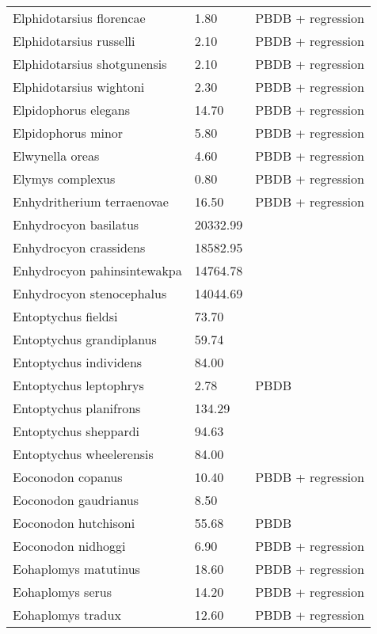 \begin{longtable}{p{} p{} p{}}
    Elphidotarsius florencae & 1.80 & PBDB + regression \\ 
    Elphidotarsius russelli & 2.10 & PBDB + regression \\ 
    Elphidotarsius shotgunensis & 2.10 & PBDB + regression \\ 
    Elphidotarsius wightoni & 2.30 & PBDB + regression \\ 
    Elpidophorus elegans & 14.70 & PBDB + regression \\ 
    Elpidophorus minor & 5.80 & PBDB + regression \\ 
    Elwynella oreas & 4.60 & PBDB + regression \\ 
    Elymys complexus & 0.80 & PBDB + regression \\ 
    Enhydritherium terraenovae & 16.50 & PBDB + regression \\ 
    Enhydrocyon basilatus & 20332.99 & \cite{Tomiya2013} \\ 
    Enhydrocyon crassidens & 18582.95 & \cite{Tomiya2013} \\ 
    Enhydrocyon pahinsintewakpa & 14764.78 & \cite{Tomiya2013} \\ 
    Enhydrocyon stenocephalus & 14044.69 & \cite{Tomiya2013} \\ 
    Entoptychus fieldsi & 73.70 & \cite{Tomiya2013} \\ 
    Entoptychus grandiplanus & 59.74 & \cite{Tomiya2013} \\ 
    Entoptychus individens & 84.00 & \cite{McKenna2011} \\ 
    Entoptychus leptophrys & 2.78 & PBDB \\ 
    Entoptychus planifrons & 134.29 & \cite{Tomiya2013} \\ 
    Entoptychus sheppardi & 94.63 & \cite{Tomiya2013} \\ 
    Entoptychus wheelerensis & 84.00 & \cite{McKenna2011} \\ 
    Eoconodon copanus & 10.40 & PBDB + regression \\ 
    Eoconodon gaudrianus & 8.50 & \cite{Zonneveld2003} \\ 
    Eoconodon hutchisoni & 55.68 & PBDB \\ 
    Eoconodon nidhoggi & 6.90 & PBDB + regression \\ 
    Eohaplomys matutinus & 18.60 & PBDB + regression \\ 
    Eohaplomys serus & 14.20 & PBDB + regression \\ 
    Eohaplomys tradux & 12.60 & PBDB + regression \\ 

\end{longtable}
